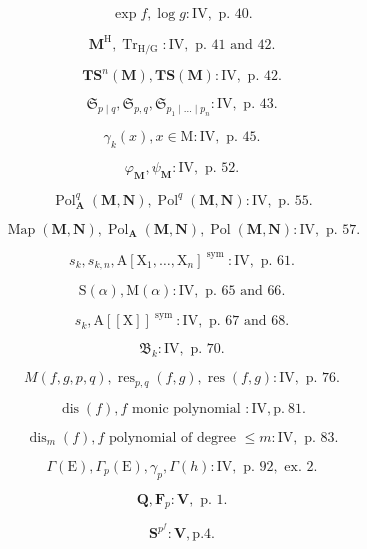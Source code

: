 \[
\exp f, \log g: \mathrm{IV}, \text { p. } 40.
\]

\[
\mathbf {M} ^ {\mathrm{H}}, \operatorname{Tr} _ {\mathrm{H} / \mathrm{G}}: \mathrm{IV}, \text { p. } 41 \text { and } 42.
\]

\[
\mathbf {T S} ^ {n} (\mathbf {M}), \mathbf {T S} (\mathbf {M}): \mathrm{IV}, \text { p. } 42.
\]

\[
\mathfrak {S} _ {p \mid q}, \mathfrak {S} _ {p, q}, \mathfrak {S} _ {p _ {1} \mid \dots \mid p _ {n}}: \mathrm{IV}, \text {   p.   } 43.
\]

\[
\gamma_ {k} (x), x \in \mathrm{M}: \mathrm{IV}, \text { p. } 45.
\]

\[
\varphi_ {\mathbf {M}}, \psi_ {\mathbf {M}}: \mathrm{IV}, \text { p. } 52.
\]

\[
\operatorname{Pol} _ {\mathbf {A}} ^ {q} (\mathbf {M}, \mathbf {N}), \operatorname{Pol} ^ {q} (\mathbf {M}, \mathbf {N}): \mathrm{IV}, \text { p. } 55.
\]

\[
\operatorname{Map} (\mathbf {M}, \mathbf {N}), \operatorname{Pol} _ {\mathbf {A}} (\mathbf {M}, \mathbf {N}), \operatorname{Pol} (\mathbf {M}, \mathbf {N}): \mathrm{IV}, \text { p. } 57.
\]

\[
s _ {k}, s _ {k, n}, \mathrm{A} [ \mathrm{X} _ {1}, \dots , \mathrm{X} _ {n} ] ^ {\text { sym }}: \mathrm{IV}, \text { p. } 61.
\]

\[
\mathrm{S} (\alpha), \mathrm{M} (\alpha): \mathrm{IV}, \text { p. } 65 \text { and } 66.
\]

\[
s _ {k}, \mathrm{A} [ [ \mathrm{X} ] ] ^ {\text { sym }}: \mathrm{IV}, \text { p. } 67 \text { and } 68.
\]

\[
\mathfrak {B} _ {k}: \mathrm{IV}, \text { p. } 70.
\]

\[
M (f, g, p, q), \operatorname{res} _ {p, q} (f, g), \operatorname{res} (f, g): \mathrm{IV}, \text {   p.   } 76.
\]

\[
\operatorname{dis} (f), f \text {   monic   polynomial }: \mathrm{IV}, \mathrm{p.~81}.
\]

\[
\operatorname{dis} _ {m} (f), f \text { polynomial   of   degree } \leqslant m: \mathrm{IV}, \text { p. } 83.
\]

\[
\Gamma (\mathrm{E}), \Gamma_ {p} (\mathrm{E}), \gamma_ {p}, \Gamma (h): \mathrm{IV}, \text { p. } 92, \text { ex. } 2.
\]

\[
\mathbf {Q}, \mathbf {F} _ {p}: \mathbf {V}, \text { p. } 1.
\]

\[
\mathbf {S} ^ {p ^ {f}}: \mathbf {V}, \mathrm{p.} 4.
\]

